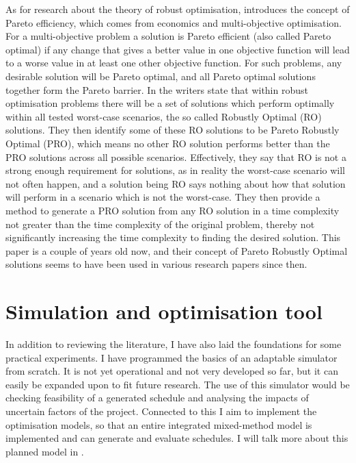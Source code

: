 \documentclass[a4paper,12pt]{article}
\begin{document}
As for research about the theory of robust optimisation, \cite{iancu2013pareto} introduces the concept of Pareto efficiency, which comes from economics and multi-objective optimisation. For a multi-objective problem a solution is Pareto efficient (also called Pareto optimal) if any change that gives a better value in one objective function will lead to a worse value in at least one other objective function. For such problems, any desirable solution will be Pareto optimal, and all Pareto optimal solutions together form the Pareto barrier. In \cite{iancu2013pareto} the writers state that within robust optimisation problems there will be a set of solutions which perform optimally within all tested worst-case scenarios, the so called Robustly Optimal (RO) solutions. They then identify some of these RO solutions to be Pareto Robustly Optimal (PRO), which means no other RO solution performs better than the PRO solutions across all possible scenarios. Effectively, they say that RO is not a strong enough requirement for solutions, as in reality the worst-case scenario will not often happen, and a solution being RO says nothing about how that solution will perform in a scenario which is not the worst-case. They then provide a method to generate a PRO solution from any RO solution in a time complexity not greater than the time complexity of the original problem, thereby not significantly increasing the time complexity to finding the desired solution. This paper is a couple of years old now, and their concept of Pareto Robustly Optimal solutions seems to have been used in various research papers since then. 

\pagebreak

\section{Simulation and optimisation tool} \label{s:sim}
In addition to reviewing the literature, I have also laid the foundations for some practical experiments. I have programmed the basics of an adaptable simulator from scratch. It is not yet operational and not very developed so far, but it can easily be expanded upon to fit future research. The use of this simulator would be checking feasibility of a generated schedule and analysing the impacts of uncertain factors of the project. Connected to this I aim to implement the optimisation models, so that an entire integrated mixed-method model is implemented and can generate and evaluate schedules. I will talk more about this planned model in .
\end{document}
